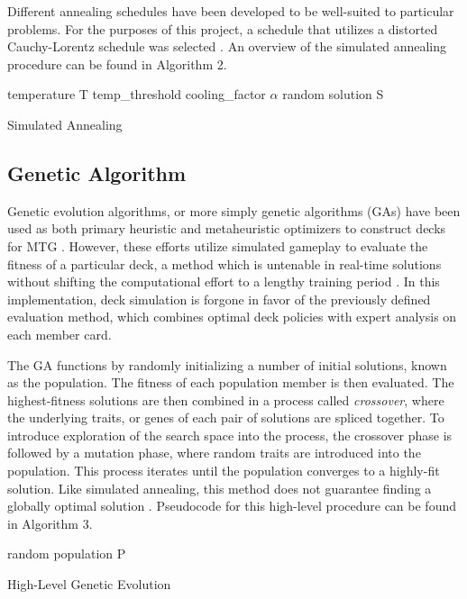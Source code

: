 \documentclass[letterpaper]{article} %
\begin{document}
Different annealing schedules have been developed to be well-suited to particular problems. For the purposes of this project, a schedule that utilizes a distorted Cauchy-Lorentz schedule was selected \cite{scipy20}. An overview of the simulated annealing procedure can be found in Algorithm 2. 

\begin{algorithm}[H]
\SetAlgoLined
{}
 temperature T\;
    temp\_threshold\;
    cooling\_factor $\alpha$\;
    random solution S\;
 \caption{Simulated Annealing}
\end{algorithm}

\subsection{Genetic Algorithm}

Genetic evolution algorithms, or more simply genetic algorithms (GAs) have been used as both primary heuristic and metaheuristic optimizers to construct decks for MTG \cite{bjorke17}. However, these efforts utilize simulated gameplay to evaluate the fitness of a particular deck, a method which is untenable in real-time solutions without shifting the computational effort to a lengthy training period \cite{el-nasr18}. In this implementation, deck simulation is forgone in favor of the previously defined evaluation method, which combines optimal deck policies with expert analysis on each member card.

The GA functions by randomly initializing a number of initial solutions, known as the population. The fitness of each population member is then evaluated. The highest-fitness solutions are then combined in a process called \textit{crossover}, where the underlying traits, or genes of each pair of solutions are spliced together. To introduce exploration of the search space into the process, the crossover phase is followed by a mutation phase, where random traits are introduced into the population. This process iterates until the population converges to a highly-fit solution. Like simulated annealing, this method does not guarantee finding a globally optimal solution \cite{scipy20a}. Pseudocode for this high-level procedure can be found in Algorithm 3.

\begin{algorithm}
\SetAlgoLined
{}
    random population P\;
\caption{High-Level Genetic Evolution}
\end{algorithm}
\end{document}
